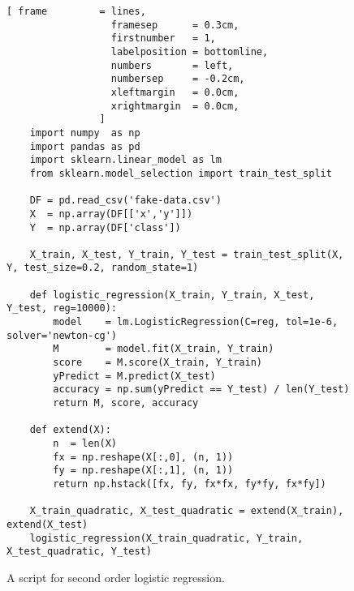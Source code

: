 \begin{figure}[!ht]
\centering
\begin{Verbatim}[ frame         = lines, 
                  framesep      = 0.3cm, 
                  firstnumber   = 1,
                  labelposition = bottomline,
                  numbers       = left,
                  numbersep     = -0.2cm,
                  xleftmargin   = 0.0cm,
                  xrightmargin  = 0.0cm,
                ]
    import numpy  as np
    import pandas as pd
    import sklearn.linear_model as lm
    from sklearn.model_selection import train_test_split
    
    DF = pd.read_csv('fake-data.csv')
    X  = np.array(DF[['x','y']])
    Y  = np.array(DF['class'])
    
    X_train, X_test, Y_train, Y_test = train_test_split(X, Y, test_size=0.2, random_state=1)
    
    def logistic_regression(X_train, Y_train, X_test, Y_test, reg=10000):
        model    = lm.LogisticRegression(C=reg, tol=1e-6, solver='newton-cg')
        M        = model.fit(X_train, Y_train)
        score    = M.score(X_train, Y_train)
        yPredict = M.predict(X_test)
        accuracy = np.sum(yPredict == Y_test) / len(Y_test)
        return M, score, accuracy
    
    def extend(X):
        n  = len(X)
        fx = np.reshape(X[:,0], (n, 1))
        fy = np.reshape(X[:,1], (n, 1))
        return np.hstack([fx, fy, fx*fx, fy*fy, fx*fy])
    
    X_train_quadratic, X_test_quadratic = extend(X_train), extend(X_test)
    logistic_regression(X_train_quadratic, Y_train, X_test_quadratic, Y_test)
\end{Verbatim}
\vspace*{-0.3cm}
\caption{A script for second order logistic regression.}
\label{fig:Polynomial-Logistic-Regression.ipynb-quadratic}
\end{figure}


